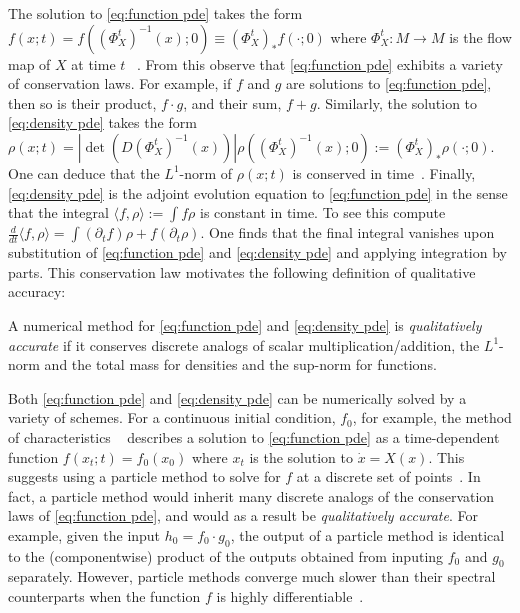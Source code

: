 \documentclass[final,leqno]{siamart}
\begin{document}
The solution to \eqref{eq:function pde} takes the form $f(x;t) = f( (\Phi_{X}^{t})^{-1}(x) ; 0) \equiv (\Phi_{X}^{t})_{*} f(\cdot;0)$
where $\Phi_{X}^{t}:M \to M$ is the flow map of $X$ at time $t$ ~\cite[Chapter 18]{Lee2006}.
From this observe that \eqref{eq:function pde} exhibits a variety of conservation laws.
For example, if $f$ and $g$ are solutions to \eqref{eq:function pde},
then so is their product, $f \cdot g$, and their sum, $f+g$.
Similarly, the solution to \eqref{eq:density pde} takes the form $\rho(x;t) = | \det( D(\Phi_{X}^{t})^{-1}(x) ) | \rho( (\Phi_{X}^{t})^{-1}(x) ;0) := (\Phi_{X}^{t})_{*} \rho(\cdot;0)$.
One can deduce that the $L^{1}$-norm of $\rho(x;t)$ is conserved in time~\cite[Theorem 16.42]{Lee2006}.
Finally, \eqref{eq:density pde} is the adjoint evolution equation to \eqref{eq:function pde} in the sense that the integral $\langle f , \rho \rangle := \int f \rho$ is constant in time. To see this compute
$\frac{d}{dt} \langle f , \rho \rangle = \int ( \partial_{t} f ) \rho + f ( \partial_{t} \rho) $.  One finds that the final integral vanishes upon substitution of \eqref{eq:function pde} and \eqref{eq:density pde} and applying integration by parts.
This conservation law motivates the following definition of qualitative accuracy:

\begin{definition} \label{def:quality}
	    A numerical method for \eqref{eq:function pde} and \eqref{eq:density pde} is \emph{qualitatively accurate} if it conserves discrete analogs of scalar multiplication/addition, the $L^{1}$-norm and the total mass for densities and the sup-norm for functions.
\end{definition}

Both \eqref{eq:function pde} and \eqref{eq:density pde} can be numerically solved by a variety of schemes.
For a continuous initial condition, $f_0$, for example, the method of characteristics ~\cite{Evans2010} describes a solution to \eqref{eq:function pde} as a time-dependent function $f( x_{t} ;t) = f_{0}( x_{0} )$ where $x_{t}$ is the solution to $\dot{x} = X(x)$.
This suggests using a particle method to solve for $f$ at a discrete set of points~\cite{Leveque1992}.
In fact, a particle method would inherit many discrete analogs of the conservation laws of \eqref{eq:function pde}, and would as a result be \emph{qualitatively accurate}.
For example, given the input $h_{0} = f_{0} \cdot g_{0}$, the output of a particle method is identical to the (componentwise) product of the outputs obtained from inputing $f_{0}$ and $g_{0}$ separately.
However, particle methods converge much slower than their spectral counterparts when the function $f$ is highly differentiable~\cite{Gottlieb2001}.
\end{document}
